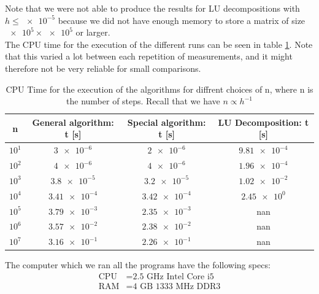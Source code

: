 \documentclass[american,a4paper,12pt]{article}
\begin{document}
  Note that we were not able to produce the results for LU decompositions with $h \le \num{e-5}$ because we did not have enough memory to store a matrix of size $\num{e5} \times \num{e5}$ or larger. \\
  The CPU time for the execution of the different runs can be seen in table \ref{tab:final_res}. Note that this varied a lot between each repetition of measurements, and it might therefore not be very reliable for small comparisons.
  \begin{table}[H]
    \begin{center}
    \caption{CPU Time for the execution of the algorithms for diffrent choices of n, where n is the number of steps. Recall that we have $n \propto h^{-1}$}
    \begin{tabular}{|c|c|c|c|} \hline
    \textbf{n} & \textbf{General algorithm: t [s]} & \textbf{Special algorithm: t [s]} & \textbf{LU Decomposition: t [s]} \\ \hline
    $10^1$ & $\num{3e-6}$     & $\num{2e-6}$    & $\num{9.81e-4}$ \\ \hline
    $10^2$ & $\num{4e-6}$     & $\num{4e-6}$    & $\num{1.96e-4}$ \\ \hline
    $10^3$ & $\num{3.8e-5}$   & $\num{3.2e-5}$  & $\num{1.02e-2}$ \\ \hline
    $10^4$ & $\num{3.41e-4}$  & $\num{3.42e-4}$ & $\num{2.45e0}$ \\ \hline
    $10^5$ & $\num{3.79e-3}$  & $\num{2.35e-3}$ & nan \\ \hline
    $10^6$ & $\num{3.57e-2}$  & $\num{2.38e-2}$ & nan \\ \hline
    $10^7$ & $\num{3.16e-1}$  & $\num{2.26e-1}$ & nan \\ \hline
    \end{tabular}
    \label{tab:final_res}
    \end{center}
  \end{table}
  The computer which we ran all the programs have the following specs:
  \begin{align*}
    \text{CPU} &= \text{2.5 GHz Intel Core i5} \\
    \text{RAM} &= \text{4 GB 1333 MHz DDR3}
  \end{align*}
\end{document}
